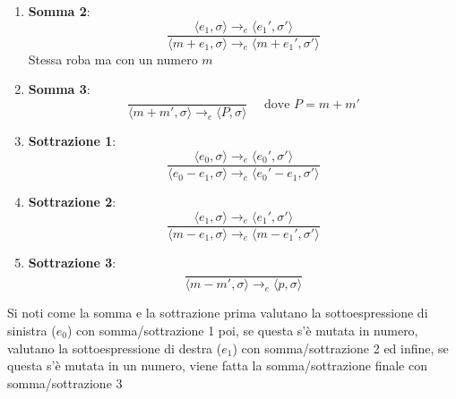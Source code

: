 \begin{itemize}
\begin{enumerate}
        \item \textbf{Somma 2}:
        \[
            \frac{\langle e_1, \sigma \rangle \rightarrow_e \langle e_1', \sigma' \rangle}{\langle m + e_1, \sigma \rangle \rightarrow_e \langle m + e_1', \sigma' \rangle}
        \]
        Stessa roba ma con un numero $m$
        \item \textbf{Somma 3}:
        \[
            \frac{}{\langle m+m', \sigma \rangle \rightarrow_e \langle P, \sigma \rangle}   \quad \text{ dove } P = m+m' 
        \]
        \item \textbf{Sottrazione 1}:
        \[
            \frac{\langle e_0, \sigma \rangle \rightarrow_e \langle e_0', \sigma' \rangle}{\langle e_0 - e_1, \sigma \rangle \rightarrow_e \langle e_0' - e_1, \sigma' \rangle}
        \]
        \item \textbf{Sottrazione 2}:
        \[
            \frac{\langle e_1, \sigma \rangle \rightarrow_e \langle e_1', \sigma' \rangle}{\langle m - e_1, \sigma \rangle \rightarrow_e \langle m - e_1', \sigma' \rangle}
        \]
        \item \textbf{Sottrazione 3}:
        \[
            \frac{}{\langle m - m', \sigma \rangle \rightarrow_e \langle p, \sigma \rangle}
        \]
        
   

    \end{enumerate}

    Si noti come la somma e la sottrazione prima valutano la sottoespressione di sinistra ($e_0$) con somma/sottrazione 1 poi, se questa s'è mutata in numero, valutano la sottoespressione di destra ($e_1$) con somma/sottrazione 2 ed infine, se questa s'è mutata in un numero, viene fatta la somma/sottrazione finale con somma/sottrazione 3

\end{itemize}


